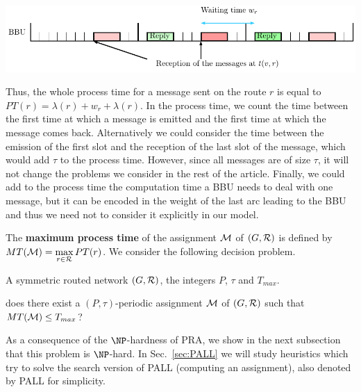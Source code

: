 \documentclass[a4paper,10pt]{article}
\begin{document}
       \begin{center}
      \includegraphics[width=\textwidth]{BBU.pdf}
      \end{center}
     
    
      Thus, the whole process time for a message sent on the route $r$ is equal to
      $PT(r)=\lambda(r)+ w_r+\lambda(r)$.      
      In the process time, we count the time between the first time at which a message is emitted and the first time at which the message comes back. Alternatively we could consider the time between the emission of the first slot and the reception of the last slot of the message, which would add $\tau$ to the process time.
      However, since all messages are of size $\tau$, it will not change the problems we consider in the rest of the article.
      Finally, we could add to the process time the computation time a BBU needs to deal with one message, but it can be encoded  in the weight of the last arc leading to the BBU and thus we need not to consider it explicitly in our model.
      
      
    The {\bf maximum process time} of the assignment ${\cal M}$ of $(G,{\cal R})$ is defined by $MT({\cal M})=\max\limits_{r \in {\cal R}} PT(r)$. We consider the following decision problem.


        A symmetric routed network $(G,{\cal R})$, the integers $P$, $\tau$ and $T_{max}$.

       does there exist a $(P,\tau)$-periodic assignment ${\cal M}$ of $(G,{\cal R})$ such that $MT({\cal M}) \leq T_{max}$?

      As a consequence of the $\NP$-hardness of PRA, we show in the next subsection that this problem is $\NP$-hard. 
      In Sec.~\ref{sec:PALL} we will study heuristics which try to solve the search version of PALL (computing an assignment), also denoted by PALL for simplicity.
\end{document}
